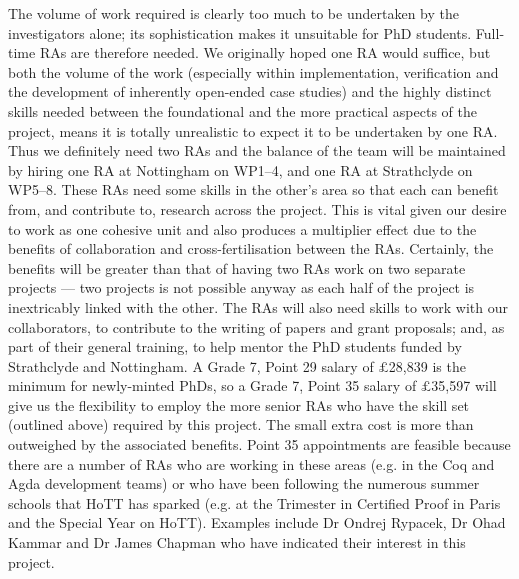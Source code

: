 \documentclass[a4paper,11pt]{article}
\begin{document}
\vspace{0.02in}

The volume of work required is clearly too much to be undertaken by
the investigators alone; its sophistication makes it unsuitable
for PhD students. Full-time RAs are therefore needed. We 
originally hoped one RA would suffice, but both the volume of the
work (especially within implementation, verification and the
development of inherently open-ended case studies) and the highly
distinct skills needed between the foundational and the
more practical aspects of the project, means it is totally unrealistic
to expect it to be undertaken by one RA. Thus we definitely need two
RAs and the balance of the team will be maintained by hiring one RA at
Nottingham on WP1--4, and one RA at Strathclyde on WP5--8. These RAs
need some skills in the other's area so that each can benefit from, and
contribute to, research across the project. This is vital given our
desire to work as one cohesive unit and also produces a multiplier
effect due to the benefits of collaboration and cross-fertilisation
between the RAs. Certainly, the benefits will be greater than that of
having two RAs work on two separate projects --- two 
projects is not possible anyway as each half of the project is
inextricably linked with the other. The RAs will also need skills to
work with our collaborators, to contribute to the writing of papers
and grant proposals; and, as part of their general training, to help
mentor the PhD students funded by Strathclyde and Nottingham.  A Grade
7, Point 29 salary of $\pounds$28,839 is the minimum for newly-minted
PhDs, so a Grade 7, Point 35 salary of $\pounds$35,597 will give us
the flexibility to employ the more senior RAs who have the 
skill set (outlined above) required by this project. The small extra
cost is more than outweighed by the associated benefits. Point 35
appointments are feasible because there are a number of RAs who are
working in these areas (e.g. in the Coq and Agda development teams) or
who have been following the numerous summer schools that HoTT has
sparked (e.g. at the Trimester in Certified Proof in Paris and the
Special Year on HoTT). Examples include Dr Ondrej Rypacek, Dr Ohad Kammar and Dr James
Chapman who have indicated their interest in this project.
\vspace{0.02in}
\end{document}

